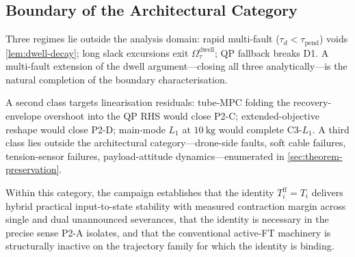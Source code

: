 \subsection{Boundary of the Architectural Category}
\label{sec:discussion-boundary}

Three regimes lie outside the analysis domain: rapid multi-fault ($\tau_d < \tau_{\mathrm{pend}}$) voids \cref{lem:dwell-decay}; long slack excursions exit $\Omega^{\mathrm{dwell}}_{\tau}$; QP fallback breaks D1. A multi-fault extension of the dwell argument---closing all three analytically---is the natural completion of the boundary characterisation.

A second class targets linearisation residuals: tube-MPC folding the recovery-envelope overshoot into the QP RHS would close P2-C; extended-objective reshape would close P2-D; main-mode $L_1$ at $\SI{10}{\kilo\gram}$ would complete C3-$L_1$. A third class lies outside the architectural category---drone-side faults, soft cable failures, tension-sensor failures, payload-attitude dynamics---enumerated in \cref{sec:theorem-preservation}.

Within this category, the campaign establishes that the identity $T_i^{\mathrm{ff}}=T_i$ delivers hybrid practical input-to-state stability with measured contraction margin across single and dual unannounced severances, that the identity is necessary in the precise sense P2-A isolates, and that the conventional active-FT machinery is structurally inactive on the trajectory family for which the identity is binding.
